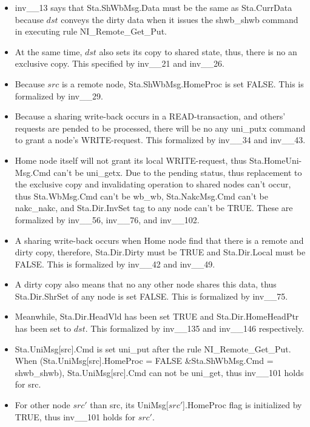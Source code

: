 \documentclass{llncs-new}
\begin{document}
\begin{itemize}
\item inv\_\_13 says that Sta.ShWbMsg.Data must be the same as Sta.CurrData because $dst$ conveys the dirty data when it issues the  shwb\_shwb command in executing rule NI\_Remote\_Get\_Put.
\item At the same time, $dst$ also sets its copy to shared state, thus, there is no an exclusive copy. This specified by inv\_\_21 and inv\_\_26.
\item Because   $src$ is a remote node, Sta.ShWbMsg.HomeProc is set FALSE. This is formalized by inv\_\_29.
\item Because  a sharing write-back occurs in a READ-transaction, and others' requests are pended to be processed, there will be no any uni\_putx command  to grant a node's WRITE-request. This formalized by inv\_\_34 and inv\_\_43.
\item Home node itself will not grant its local WRITE-request, thus Sta.HomeUni-Msg.Cmd  can't be  uni\_getx. Due to the pending status, thus replacement to the exclusive copy and invalidating operation to shared nodes can't occur, thus Sta.WbMsg.Cmd can't be wb\_wb, Sta.NakcMsg.Cmd can't be nakc\_nakc, and Sta.Dir.InvSet tag to any node can't be TRUE. These are formalized by inv\_\_56, inv\_\_76, and inv\_\_102.
\item A sharing write-back occurs when Home node find that there is a remote and dirty copy, therefore, Sta.Dir.Dirty must be TRUE and Sta.Dir.Local must be FALSE. This is formalized by inv\_\_42 and inv\_\_49.
\item A dirty copy also means that no any other node shares this data, thus Sta.Dir.ShrSet of any node is set FALSE. This is formalized by inv\_\_75.
\item Meanwhile, Sta.Dir.HeadVld has been set TRUE and Sta.Dir.HomeHeadPtr has been set to $dst$. This formalized by inv\_\_135 and inv\_\_146 respectively.
\item Sta.UniMsg[src].Cmd  is set uni\_put after the rule NI\_Remote\_Get\_Put. When (Sta.UniMsg[src].HomeProc = FALSE \&Sta.ShWbMsg.Cmd = shwb\_shwb), Sta.UniMsg[src].Cmd can not be uni\_get, thus inv\_\_101 holds for src.
\item For other node $src'$ than src, its UniMsg[$src'$].HomeProc flag is initialized by TRUE,  thus inv\_\_101 holds for $src'$.
\end{itemize}
\end{document}
